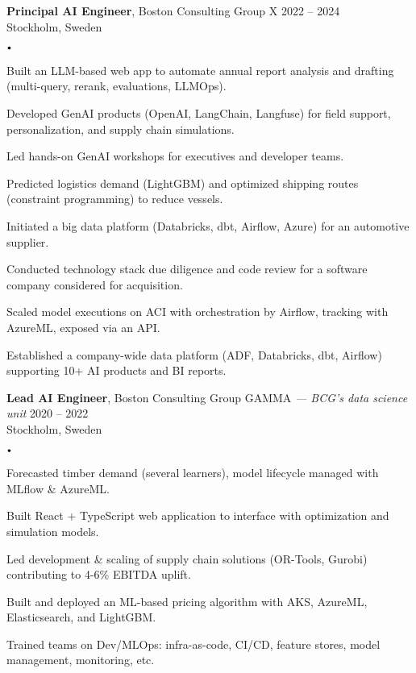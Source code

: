 \documentclass{article}
\newcommand{\experience}[5]{
    \vspace*{2pt}
    \textbf{#1}, #2 \hfill #3 \\ 
    #4 \\
    #5
    \vspace*{2pt}
}
\newcommand{\spacedbullet}{
    $\vcenter{\hbox{\tiny$\bullet$}}$\hspace*{-2pt}
}
\newenvironment{bulletlist}{
    \begin{list}
        {\spacedbullet}{\setlength\leftmargin{10pt} 
        \topsep 0pt \itemsep -2pt}}{\vspace*{4pt}
    \end{list}
}
\begin{document}
\experience{Principal AI Engineer}{Boston Consulting Group X}{2022 -- 2024}{Stockholm, Sweden}
{
    \begin{bulletlist}
        \item Built an LLM-based web app to automate annual report analysis and drafting (multi-query, rerank, evaluations, LLMOps).
        \item Developed GenAI products (OpenAI, LangChain, Langfuse) for field support, personalization, and supply chain simulations.
        \item Led hands-on GenAI workshops for executives and developer teams.
        \item Predicted logistics demand (LightGBM) and optimized shipping routes (constraint programming) to reduce vessels.
        \item Initiated a big data platform (Databricks, dbt, Airflow, Azure) for an automotive supplier.
        \item Conducted technology stack due diligence and code review for a software company considered for acquisition.
        \item Scaled model executions on ACI with orchestration by Airflow, tracking with AzureML, exposed via an API.
        \item Established a company-wide data platform (ADF, Databricks, dbt, Airflow) supporting 10+ AI products and BI reports.
    \end{bulletlist}
}

\experience{Lead AI Engineer}{Boston Consulting Group GAMMA \textit{— BCG's data science unit}}{2020 -- 2022}{Stockholm, Sweden}
{
    \begin{bulletlist}
        \item Forecasted timber demand (several learners), model lifecycle managed with MLflow \& AzureML.
        \item Built React + TypeScript web application to interface with optimization and simulation models.
        \item Led development \& scaling of supply chain solutions (OR-Tools, Gurobi) contributing to 4-6\% EBITDA uplift.
        \item Built and deployed an ML-based pricing algorithm with AKS, AzureML, Elasticsearch, and LightGBM.
        \item Trained teams on Dev/MLOps: infra-as-code, CI/CD, feature stores, model management, monitoring, etc.
    \end{bulletlist}
}
\end{document}
